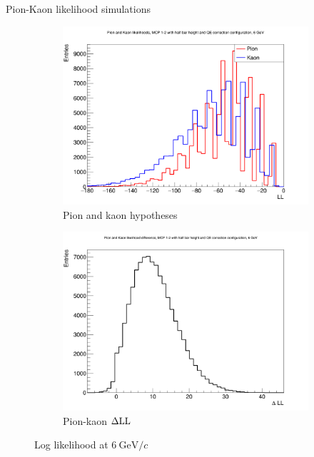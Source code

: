 \documentclass{beamer}
\begin{document}
\begin{frame}{Pion-Kaon likelihood simulations}
  \begin{figure}
    \centering
    \vspace{-0.2cm}
    \begin{subfigure}{0.5\textwidth}
      \includegraphics[width = 1.0\textwidth]{Plots/PionKaonLL6GeVStandardMCPAB.png}
      \caption{Pion and kaon hypotheses}
    \end{subfigure}%
    \begin{subfigure}{0.5\textwidth}
      \includegraphics[width = 1.0\textwidth]{Plots/PionKaonDLL6GeVStandardMCPAB.png}
      \caption{Pion-kaon $\Delta{\rm LL}$}
    \end{subfigure}
    \caption{Log likelihood at $\SI{6}{\giga\eV/c}$}
  \end{figure}
\end{frame}
\end{document}
